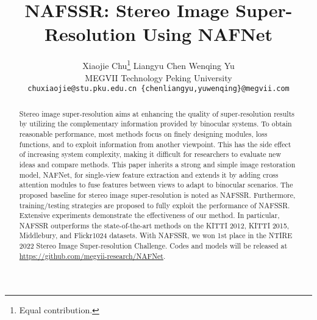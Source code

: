 \documentclass[10pt,twocolumn,letterpaper]{article}
\begin{document}
\title{NAFSSR: Stereo Image Super-Resolution Using NAFNet}

\author{ Xiaojie Chu\thanks{Equal contribution.}\hspace{20pt}  Liangyu Chen\footnotemark[1]  \hspace{20pt} Wenqing Yu \\ 
{} MEGVII Technology \hspace{20pt} {} Peking University \\
{\tt\small chuxiaojie@stu.pku.edu.cn \hspace{20pt} \{chenliangyu,yuwenqing\}@megvii.com}
}
\maketitle

\maketitle




\begin{abstract}
Stereo image super-resolution aims at enhancing the quality of super-resolution results by utilizing the complementary information provided by binocular systems. To obtain reasonable performance, most methods focus on finely designing modules, loss functions, and \etc to exploit information from another viewpoint. This has the side effect of increasing system complexity, making it difficult for researchers to evaluate new ideas and compare methods. This paper inherits a strong and simple image restoration model, NAFNet, for single-view feature extraction and extends it by adding cross attention modules to fuse features between views to adapt to binocular scenarios. The proposed baseline for stereo image super-resolution is noted as NAFSSR. Furthermore, training/testing strategies are proposed to fully exploit the performance of NAFSSR. Extensive experiments demonstrate the effectiveness of our method. In particular, NAFSSR outperforms the state-of-the-art methods on the KITTI 2012, KITTI 2015, Middlebury, and Flickr1024 datasets. With NAFSSR, we won 1st place in the NTIRE 2022 Stereo Image Super-resolution Challenge. Codes and models will be released at \url{https://github.com/megvii-research/NAFNet}.
\end{abstract}
\end{document}
